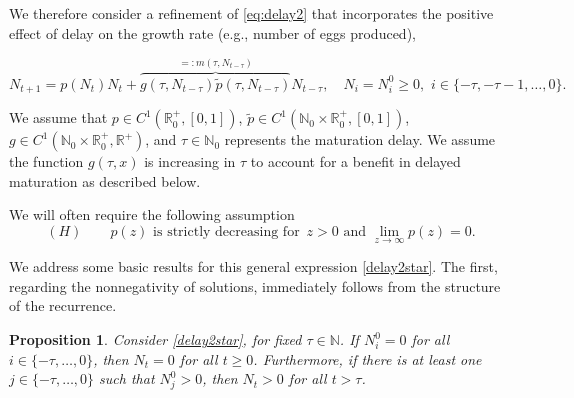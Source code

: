 \documentclass{article}
\numberwithin{theorem}{section}
\newtheorem{proposition}[theorem]{Proposition}
\begin{document}
We therefore consider a refinement of \eqref{eq:delay2} that incorporates the positive effect of delay on the growth rate (e.g., number of eggs produced), 

\begin{equation}\label{delay2star}
   N_{t+1}=p(N_t)N_t 
+ \overbrace{g(\tau, N_{t-\tau})\widetilde{p}(\tau,N_{t-\tau})}^{=:m(\tau, N_{t-\tau})}N_{t-\tau},   \quad N_i=N_i^0 \geq 0, \, \, i  \in \{-\tau, -\tau-1, \ldots, 0\}. 
\end{equation}


We assume that $p\in C^1(\mathbb{R}^+_0, [0,1])$,  $\widetilde{p}\in C^1(\mathbb{N}_0\times \mathbb{R}^+_0, [0,1])$, $g\in C^1(\mathbb{N}_0\times \mathbb{R}^+_0, \mathbb{R}^+)$, and $\tau\in \mathbb{N}_0$ represents the maturation delay.   We assume the function  $g(\tau, x)$ is increasing in $\tau$ to account for a benefit in delayed maturation as described below.

We will often require the following assumption
\begin{equation}\label{eq:H}(H) \qquad p(z) \mbox{ is strictly decreasing for } \, z> 0 \mbox{ and }  \lim_{z\to \infty}p(z)=0.
\end{equation}

 


We address some basic results for this general expression \eqref{delay2star}. The first, regarding the nonnegativity of solutions, immediately follows from the structure of the recurrence. 
 

\begin{proposition}\label{Proppos}
Consider \eqref{delay2star}, for fixed $\tau\in \mathbb{N}$. If $N_i^0=0$ for all $i\in \{-\tau, \ldots, 0\}$, then $N_t=0$ for all $t\geq 0$. Furthermore, if there is at least one $j\in \{-\tau, \ldots, 0\}$ such that $N_j^0>0$, then $N_t>0$ for all $t>\tau$. 
\end{proposition}
\end{document}

